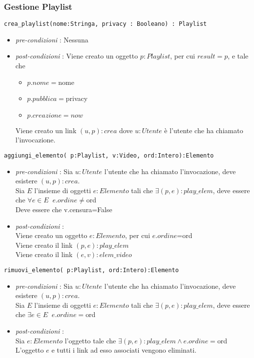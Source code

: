 \documentclass[12pt, letterpaper]{article}
\newcommand{\code}[1]{\colorbox{light-gray}{\texttt{#1}}}
\newcommand{\id}{{\hphantom{ident}}}
\begin{document}
\subsubsection{Gestione Playlist}
\code{crea\_playlist(nome:Stringa, privacy : Booleano) : Playlist}\begin{itemize}
    \item \textit{pre-condizioni} : Nessuna 
    \item \textit{post-condizioni} : Viene creato un oggetto $p:Playlist$, per cui $result=p$, 
    e tale che \begin{itemize}
        \item $p.nome=$nome 
        \item $p.pubblica=$privacy 
        \item $p.creazione=now$
    \end{itemize}
    Viene creato un link $(u,p):crea$ dove $u:Utente$ è l'utente che ha chiamato l'invocazione.
\end{itemize}
\code{aggiungi\_elemento( p:Playlist, v:Video, ord:Intero):Elemento}\begin{itemize}
    \item \textit{pre-condizioni} : Sia $u:Utente$ l'utente che ha chiamato l'invocazione, 
    deve esistere $(u,p):crea$. \\ 
    Sia $E$ l'insieme di oggetti $e:Elemento$ tali che $\exists (p,e):play\_elem$, deve 
    essere che $\forall e\in E\;\;e.ordine\ne$ord \\ 
    Deve essere che v.censura=False
    \item \textit{post-condizioni} : \\\id Viene creato un oggetto $e:Elemento$, per cui $e.ordine$=ord\\ 
    \id Viene creato il link $(p,e):play\_elem$ \\ 
    \id Viene creato il link $(e,v):elem\_video$
\end{itemize}
\code{rimuovi\_elemento( p:Playlist, ord:Intero):Elemento}\begin{itemize}
    \item \textit{pre-condizioni} : Sia $u:Utente$ l'utente che ha chiamato l'invocazione, 
    deve esistere $(u,p):crea$. \\ 
    Sia $E$ l'insieme di oggetti $e:Elemento$ tali che $\exists (p,e):play\_elem$, deve 
    essere che $\exists e\in E\;\;e.ordine=$ord 
    \item \textit{post-condizioni} : \\ 
    \id  Sia $e:Elemento$ l'oggetto tale che $\exists (p,e):play\_elem\land e.ordine=$ord\\ 
    \id L'oggetto $e$ e tutti i link ad esso associati vengono eliminati.
\end{itemize}
\end{document}
